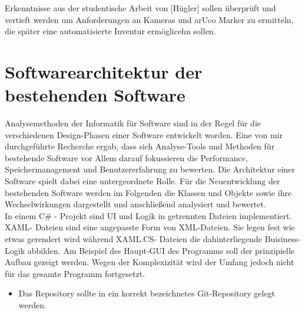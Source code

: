 \documentclass[11pt]{scrartcl}
\begin{document}
    Erkenntnisse aus der studentische Arbeit von [Hügler] sollen überprüft und vertieft werden um Anforderungen an Kameras und arUco Marker zu ermitteln, die später eine automatisierte Inventur ermöglicehn sollen.
    \newpage
    \section {Softwarearchitektur der bestehenden Software}
    Analysemethoden der Informatik für Software sind in der Regel für die verschiedenen Design-Phasen einer Software entwickelt worden. Eine von mir durchgeführte Recherche ergab,
    dass sich Analyse-Tools und Methoden für bestehende Software vor Allem darauf fokussieren die Performance, Speichermanagement und Benutzererfahrung zu bewerten.
    Die Architektur einer Software spielt dabei eine untergeordnete Rolle.
    Für die Neuentwicklung der bestehenden Software werden im Folgenden die Klassen und Objekte sowie ihre Wechselwirkungen dargestellt und anschließend analysiert und bewertet.
    \\
    In einem C\# - Projekt sind UI und Logik in getrennten Dateien implementiert. XAML- Dateien sind eine angepasste Form von XML-Dateien. Sie legen fest wie etwas gerendert wird während
    XAML.CS- Dateien die dahinterliegende Buisiness-Logik abbilden.
    Am Beispiel des Haupt-GUI des Programms soll der prinzipielle Aufbau gezeigt werden. Wegen der Komplexizität wird der Umfang jedoch nicht für das gesamte Programm fortgesetzt.
    \begin{itemize}
        \item Das Repository sollte in ein korrekt bezeichnetes Git-Repository gelegt werden.
    \end{itemize}
\end{document}
